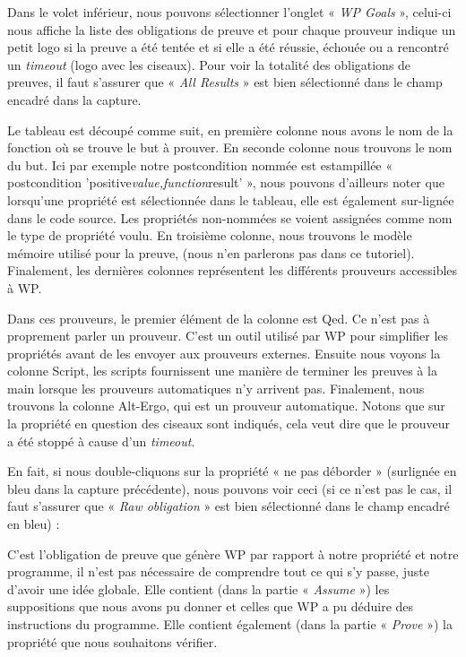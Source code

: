 Dans le volet inférieur, nous pouvons sélectionner l'onglet « \textit{WP Goals} », 
celui-ci nous affiche la liste des obligations de preuve et pour chaque 
prouveur indique un petit logo si la preuve a été tentée et si elle a été 
réussie, échouée ou a rencontré un \textit{timeout} (logo avec les ciseaux).
Pour voir la totalité des obligations de preuves, il
faut s'assurer que « \textit{All Results} » est bien sélectionné dans le champ encadré
dans la capture.





Le tableau est découpé comme suit, en première colonne nous avons le nom de la
fonction où se trouve le but à prouver. En seconde colonne nous trouvons le nom
du but. Ici par exemple notre postcondition nommée est estampillée 
« postcondition 'positive\textit{value,function}result' », nous pouvons d'ailleurs noter
que lorsqu'une propriété est sélectionnée dans le tableau, elle est également 
sur-lignée dans le code source. Les propriétés non-nommées se voient assignées
comme nom le type de propriété voulu. En troisième colonne, nous trouvons le 
modèle mémoire utilisé pour la preuve, (nous n'en parlerons pas dans ce 
tutoriel). Finalement, les dernières colonnes représentent les différents 
prouveurs accessibles à WP.



Dans ces prouveurs, le premier élément de la colonne est Qed. Ce n'est pas
à proprement parler un prouveur. C'est un outil utilisé par WP pour simplifier
les propriétés avant de les envoyer aux prouveurs externes. Ensuite nous
voyons la colonne Script, les scripts fournissent une manière de terminer
les preuves à la main lorsque les prouveurs automatiques n'y arrivent pas.
Finalement, nous trouvons la colonne Alt-Ergo, qui est un prouveur automatique.
Notons que sur la propriété en question des ciseaux sont indiqués, cela
veut dire que le prouveur a été stoppé à cause d'un \textit{timeout}.


En fait, si nous double-cliquons sur la 
propriété « ne pas déborder » (surlignée en bleu dans la capture précédente), 
nous pouvons voir ceci (si ce n'est pas le cas, il faut s'assurer que
« \textit{Raw obligation} » est bien sélectionné dans le champ encadré en bleu) :





C'est l'obligation de preuve que génère WP par rapport à notre propriété et 
notre programme, il n'est pas nécessaire de comprendre tout ce qui s'y passe, 
juste d'avoir une idée globale. Elle contient (dans la partie « \textit{Assume} ») les 
suppositions que nous avons pu donner et celles que WP a pu déduire des 
instructions du programme. Elle contient également (dans la partie « \textit{Prove} ») 
la propriété que nous souhaitons vérifier.



